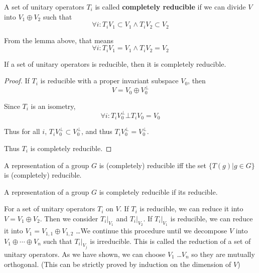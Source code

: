 \documentclass[12pt]{book}
\begin{document}
	\begin{definition}
	A set of unitary operators $T_i$ is called {\bf completely reducible} if we can divide $V$ into $V_1\oplus V_2$ such that
	\begin{equation}
	\forall i:T_iV_1\subset V_1\wedge T_iV_2\subset V_2
	\end{equation}
	
	From the lemma above, that means
	\begin{equation}
	\forall i:T_iV_1=V_1\wedge T_iV_2=V_2
	\end{equation}
	
	\end{definition}
	\begin{theorem}
		If a set of unitary operators is reducible, then it is completely reducible.
	\end{theorem}
	\begin{proof}
		If $T_i$ is reducible with a proper invariant subspace $V_0$, then
		\begin{equation}
		V=V_0\oplus V_0^\bot
		\end{equation}
		
		Since $T_i$ is an isometry,
		\begin{equation}
		\forall i:T_iV_0^\bot\bot T_iV_0=V_0
		\end{equation}
		
		Thus for all $i$, $T_iV_0^\bot\subset V_0^\bot$, and thus $T_iV_0^\bot= V_0^\bot$.
		
		Thus $T_i$ is completely reducible.
	\end{proof}
	
	\begin{definition}
	A representation of a group $G$ is (completely) reducible iff the set $\{T(g)|g\in G\}$ is (completely) reducible.
	\end{definition}
	
	\begin{lemma}
		A representation of a group $G$ is completely reducible if its reducible.
	\end{lemma}
	
	For a set of unitary operators $T_i$ on $V$. If $T_i$ is reducible, we can reduce it into $V=V_1\oplus V_2$. Then we consider $T_i|_{V_1}$ and $T_i|_{V_2}$. If $T_i|_{V_1}$ is reducible, we can reduce it into $V_1=V_{1,1}\oplus V_{1,2}$ \dots We continue this procedure until we decompose $V$ into $V_1\oplus\cdots\oplus V_n$ such that $T_i|_{V_j}$ is irreducible. This is called the reduction of a set of unitary operators. As we have shown, we can choose $V_1$ \dots $V_n$ so they are mutually orthogonal. (This can be strictly proved by induction on the dimension of $V$)
	
\end{document}
